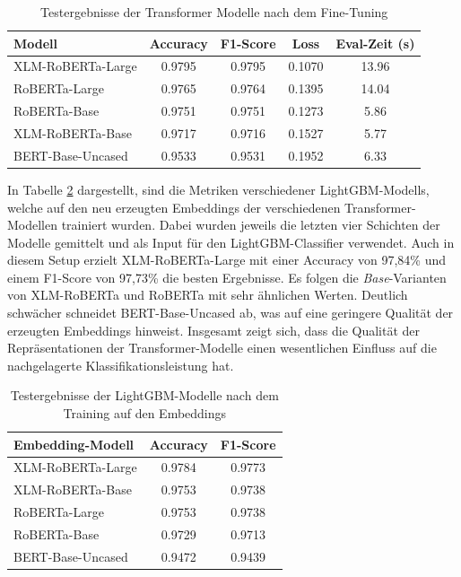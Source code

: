 \begin{table}[!ht]
\centering
\begin{tabular}{lcccc}
    \toprule
    \textbf{Modell} & \textbf{Accuracy} & \textbf{F1-Score} & \textbf{Loss} & \textbf{Eval-Zeit (s)} \\
    \midrule
    XLM-RoBERTa-Large & 0.9795 & 0.9795 & 0.1070 & 13.96 \\
    RoBERTa-Large     & 0.9765 & 0.9764 & 0.1395 & 14.04 \\
    RoBERTa-Base      & 0.9751 & 0.9751 & 0.1273 & 5.86 \\
    XLM-RoBERTa-Base  & 0.9717 & 0.9716 & 0.1527 & 5.77 \\
    BERT-Base-Uncased & 0.9533 & 0.9531 & 0.1952 & 6.33 \\
    \bottomrule
\end{tabular}
\caption{Testergebnisse der Transformer Modelle nach dem Fine-Tuning}
\label{tab:vergleich_der_transformer_modelle}
\end{table}

In Tabelle \ref{tab:vergleich_lightgbm_modelle} dargestellt, sind die Metriken verschiedener LightGBM-Modells, welche auf den neu erzeugten 
Embeddings der verschiedenen Transformer-Modellen trainiert wurden.
Dabei wurden jeweils die letzten vier Schichten der Modelle gemittelt und als Input für den LightGBM-Classifier verwendet. 
Auch in diesem Setup erzielt XLM-RoBERTa-Large mit einer Accuracy von 97,84\% und einem F1-Score von 97,73\% die besten Ergebnisse. 
Es folgen die \textit{Base}-Varianten von XLM-RoBERTa und RoBERTa mit sehr ähnlichen Werten. Deutlich schwächer schneidet BERT-Base-Uncased ab, 
was auf eine geringere Qualität der erzeugten Embeddings hinweist. Insgesamt zeigt sich, dass die Qualität der Repräsentationen der Transformer-Modelle 
einen wesentlichen Einfluss auf die nachgelagerte Klassifikationsleistung hat.

\begin{table}[!ht]
\centering
\begin{tabular}{lcc}
    \toprule
    \textbf{Embedding-Modell} & \textbf{Accuracy} & \textbf{F1-Score} \\
    \midrule
    XLM-RoBERTa-Large & 0.9784 & 0.9773 \\
    XLM-RoBERTa-Base  & 0.9753 & 0.9738 \\
    RoBERTa-Large     & 0.9753 & 0.9738 \\
    RoBERTa-Base      & 0.9729 & 0.9713 \\
    BERT-Base-Uncased & 0.9472 & 0.9439 \\
    \bottomrule
\end{tabular}
\caption{Testergebnisse der LightGBM-Modelle nach dem Training auf den Embeddings}
\label{tab:vergleich_lightgbm_modelle}
\end{table}


